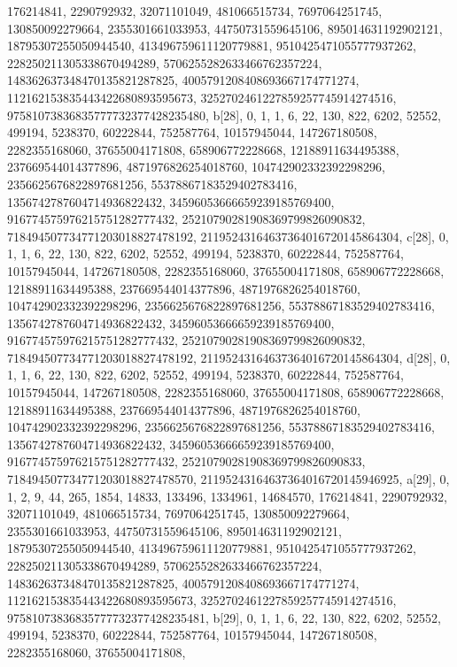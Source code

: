 {{{   176214841, 2290792932, 32071101049, 481066515734, 7697064251745, 
   130850092279664, 2355301661033953, 44750731559645106, 895014631192902121, 
   18795307255050944540, 413496759611120779881, 9510425471055777937262, 
   228250211305338670494289, 5706255282633466762357224, 
   148362637348470135821287825, 4005791208408693667174771274, 
   112162153835443422680893595673, 3252702461227859257745914274516, 
   97581073836835777732377428235480}}, 
 {b[28], {0, 1, 1, 6, 22, 130, 822, 6202, 52552, 499194, 5238370, 60222844, 
   752587764, 10157945044, 147267180508, 2282355168060, 37655004171808, 
   658906772228668, 12188911634495388, 237669544014377896, 
   4871976826254018760, 104742902332392298296, 2356625676822897681256, 
   55378867183529402783416, 1356742787604714936822432, 
   34596053666659239185769400, 916774575976215751282777432, 
   25210790281908369799826090832, 718494507734771203018827478192, 
   21195243164637364016720145864304}}, 
 {c[28], {0, 1, 1, 6, 22, 130, 822, 6202, 52552, 499194, 5238370, 60222844, 
   752587764, 10157945044, 147267180508, 2282355168060, 37655004171808, 
   658906772228668, 12188911634495388, 237669544014377896, 
   4871976826254018760, 104742902332392298296, 2356625676822897681256, 
   55378867183529402783416, 1356742787604714936822432, 
   34596053666659239185769400, 916774575976215751282777432, 
   25210790281908369799826090832, 718494507734771203018827478192, 
   21195243164637364016720145864304}}, 
 {d[28], {0, 1, 1, 6, 22, 130, 822, 6202, 52552, 499194, 5238370, 60222844, 
   752587764, 10157945044, 147267180508, 2282355168060, 37655004171808, 
   658906772228668, 12188911634495388, 237669544014377896, 
   4871976826254018760, 104742902332392298296, 2356625676822897681256, 
   55378867183529402783416, 1356742787604714936822432, 
   34596053666659239185769400, 916774575976215751282777432, 
   25210790281908369799826090833, 718494507734771203018827478570, 
   21195243164637364016720145946925}}, 
 {a[29], {0, 1, 2, 9, 44, 265, 1854, 14833, 133496, 1334961, 14684570, 
   176214841, 2290792932, 32071101049, 481066515734, 7697064251745, 
   130850092279664, 2355301661033953, 44750731559645106, 895014631192902121, 
   18795307255050944540, 413496759611120779881, 9510425471055777937262, 
   228250211305338670494289, 5706255282633466762357224, 
   148362637348470135821287825, 4005791208408693667174771274, 
   112162153835443422680893595673, 3252702461227859257745914274516, 
   97581073836835777732377428235481}}, 
 {b[29], {0, 1, 1, 6, 22, 130, 822, 6202, 52552, 499194, 5238370, 60222844, 
   752587764, 10157945044, 147267180508, 2282355168060, 37655004171808, 
}}}
